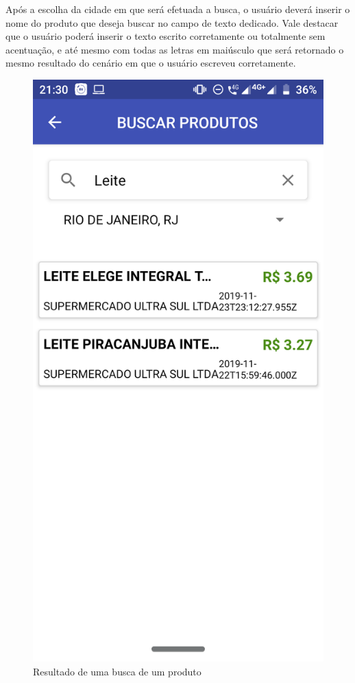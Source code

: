 \newpage
Após a escolha da cidade em que será efetuada a busca, o usuário deverá inserir o nome do produto que deseja buscar no campo de texto dedicado. Vale destacar que o usuário poderá inserir o texto escrito corretamente ou totalmente sem acentuação, e até mesmo com todas as letras em maiúsculo que será retornado o mesmo resultado do cenário em que o usuário escreveu corretamente.

\newpage
\begin{figure}[h]
    \centering
    \includegraphics[scale=0.15]{tcc/figures/app/app_buscar_produtos_busca.png}
    \caption{Resultado de uma busca de um produto}
    \label{appBuscaProdutosBuscaResultadoFig}
\end{figure}

